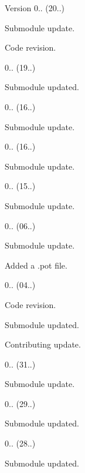\begin{DoxyVersion}{Version}
0.. (20..)
\begin{DoxyItemize}
\item Submodule update.
\item Code revision. 
\end{DoxyItemize}

0.. (19..)
\begin{DoxyItemize}
\item Submodule updated. 
\end{DoxyItemize}

0.. (16..)
\begin{DoxyItemize}
\item Submodule update. 
\end{DoxyItemize}

0.. (16..)
\begin{DoxyItemize}
\item Submodule update. 
\end{DoxyItemize}

0.. (15..)
\begin{DoxyItemize}
\item Submodule update. 
\end{DoxyItemize}

0.. (06..)
\begin{DoxyItemize}
\item Submodule update.
\item Added a .pot file. 
\end{DoxyItemize}

0.. (04..)
\begin{DoxyItemize}
\item Code revision.
\item Submodule updated.
\item Contributing update. 
\end{DoxyItemize}

0.. (31..)
\begin{DoxyItemize}
\item Submodule update. 
\end{DoxyItemize}

0.. (29..)
\begin{DoxyItemize}
\item Submodule updated. 
\end{DoxyItemize}

0.. (28..)
\begin{DoxyItemize}
\item Submodule updated. 
\end{DoxyItemize}


\end{DoxyVersion}
